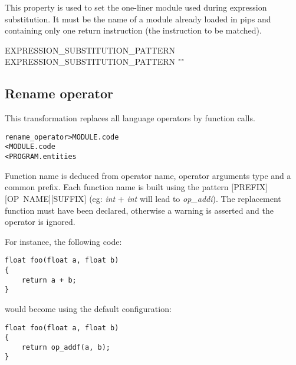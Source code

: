 \documentclass[a4paper]{report}
\newenvironment{PipsMake}{\begin{alltt}}{\end{alltt}}
\newenvironment{PipsPass}[1]{\label{pass:#1}}{}
\begin{document}
This property is used to set the one-liner module used during
expression substitution. It must be the name of a module already
loaded in pips and containing only one return instruction (the
instruction to be matched).
\begin{PipsProp}{EXPRESSION_SUBSTITUTION_PATTERN}
EXPRESSION_SUBSTITUTION_PATTERN ""
\end{PipsProp}

\subsection{Rename operator}
\begin{PipsPass}{rename_operator}
This transformation replaces all language operators by function calls.
\end{PipsPass}

\begin{PipsMake}
rename_operator > MODULE.code
                < MODULE.code
                < PROGRAM.entities
\end{PipsMake}

Function name is deduced from operator name, operator arguments type and a common prefix. Each function name is built using the pattern [PREFIX][OP~NAME][SUFFIX] (eg: \emph{int} + \emph{int} will lead to \emph{op\_addi}). The replacement function must have been declared, otherwise a warning is asserted and the operator is ignored.

\vspace{5pt}
\begin{minipage}{\textwidth}
For instance, the following code:
\begin{lstlisting}
float foo(float a, float b)
{
    return a + b;
}
\end{lstlisting}
\end{minipage}

\vspace{5pt}
\begin{minipage}{\textwidth}
would become using the default configuration:
\begin{lstlisting}
float foo(float a, float b)
{
    return op_addf(a, b);
}
\end{lstlisting}
\end{minipage}
\end{document}
